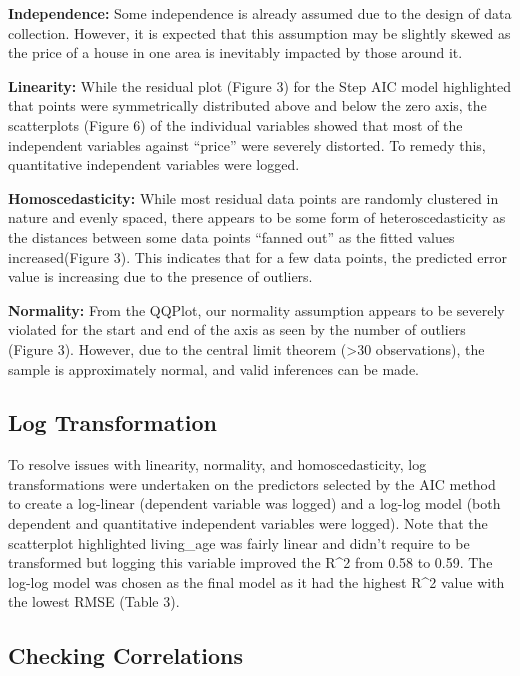 \documentclass[letterpaper,8pt,twocolumn,twoside,]{pinp}
\begin{document}
\textbf{Independence:} Some independence is already assumed due to the
design of data collection. However, it is expected that this assumption
may be slightly skewed as the price of a house in one area is inevitably
impacted by those around it.

\textbf{Linearity:} While the residual plot (Figure 3) for the Step AIC
model highlighted that points were symmetrically distributed above and
below the zero axis, the scatterplots (Figure 6) of the individual
variables showed that most of the independent variables against
``price'' were severely distorted. To remedy this, quantitative
independent variables were logged.

\textbf{Homoscedasticity:} While most residual data points are randomly
clustered in nature and evenly spaced, there appears to be some form of
heteroscedasticity as the distances between some data points ``fanned
out'' as the fitted values increased(Figure 3). This indicates that for
a few data points, the predicted error value is increasing due to the
presence of outliers.

\textbf{Normality:} From the QQPlot, our normality assumption appears to
be severely violated for the start and end of the axis as seen by the
number of outliers (Figure 3). However, due to the central limit theorem
(\textgreater30 observations), the sample is approximately normal, and
valid inferences can be made.

\subsection{Log Transformation}\label{log-transformation}

To resolve issues with linearity, normality, and homoscedasticity, log
transformations were undertaken on the predictors selected by the AIC
method to create a log-linear (dependent variable was logged) and a
log-log model (both dependent and quantitative independent variables
were logged). Note that the scatterplot highlighted living\_age was
fairly linear and didn't require to be transformed but logging this
variable improved the R\^{}2 from 0.58 to 0.59. The log-log model was
chosen as the final model as it had the highest R\^{}2 value with the
lowest RMSE (Table 3).

\subsection{Checking Correlations}\label{checking-correlations}
\end{document}
